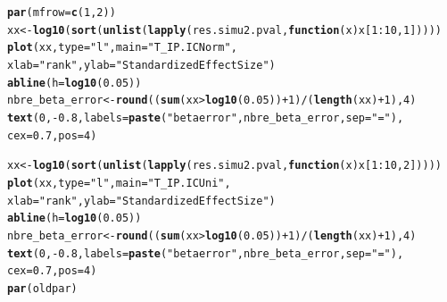 \documentclass[12pt]{article}\usepackage[]{graphicx}\usepackage[]{color}
\makeatletter
\newcommand{\hlnum}[1]{\textcolor[rgb]{0.686,0.059,0.569}{#1}}%
\newcommand{\hlstr}[1]{\textcolor[rgb]{0.192,0.494,0.8}{#1}}%
\newcommand{\hlopt}[1]{\textcolor[rgb]{0,0,0}{#1}}%
\newcommand{\hlstd}[1]{\textcolor[rgb]{0.345,0.345,0.345}{#1}}%
\newcommand{\hlkwa}[1]{\textcolor[rgb]{0.161,0.373,0.58}{\textbf{#1}}}%
\newcommand{\hlkwb}[1]{\textcolor[rgb]{0.69,0.353,0.396}{#1}}%
\newcommand{\hlkwc}[1]{\textcolor[rgb]{0.333,0.667,0.333}{#1}}%
\newcommand{\hlkwd}[1]{\textcolor[rgb]{0.737,0.353,0.396}{\textbf{#1}}}%
\newenvironment{kframe}{%
 \def\at@end@of@kframe{}%
 \ifinner\ifhmode%
  \def\at@end@of@kframe{\end{minipage}}%
  \begin{minipage}{\columnwidth}%
 \fi\fi%
 \def\FrameCommand##1{\hskip\@totalleftmargin \hskip-\fboxsep
 \colorbox{shadecolor}{##1}\hskip-\fboxsep
     \hskip-\linewidth \hskip-\@totalleftmargin \hskip\columnwidth}%
 \MakeFramed {\advance\hsize-\width
   \@totalleftmargin\z@ \linewidth\hsize
   \@setminipage}}%
 {\par\unskip\endMakeFramed%
 \at@end@of@kframe}
\newenvironment{knitrout}{}{} %
\makeatother
\begin{document}
\begin{knitrout}\small
{}\color{fgcolor}\begin{kframe}
\begin{alltt}
\hlkwd{par}\hlstd{(}\hlkwc{mfrow} \hlstd{=} \hlkwd{c}\hlstd{(}\hlnum{1}\hlstd{,} \hlnum{2}\hlstd{))}
\hlstd{xx} \hlkwb{<-} \hlkwd{log10}\hlstd{(}\hlkwd{sort}\hlstd{(}\hlkwd{unlist}\hlstd{(}\hlkwd{lapply}\hlstd{(res.simu2.pval,} \hlkwa{function}\hlstd{(}\hlkwc{x}\hlstd{) x[}\hlnum{1}\hlopt{:}\hlnum{10}\hlstd{,} \hlnum{1}\hlstd{]))))}
\hlkwd{plot}\hlstd{(xx,} \hlkwc{type} \hlstd{=} \hlstr{"l"}\hlstd{,} \hlkwc{main} \hlstd{=} \hlstr{"T_IP.IC Norm"}\hlstd{,}
     \hlkwc{xlab} \hlstd{=} \hlstr{"rank"}\hlstd{,} \hlkwc{ylab} \hlstd{=} \hlstr{"Standardized Effect Size"}\hlstd{)}
\hlkwd{abline}\hlstd{(}\hlkwc{h} \hlstd{=} \hlkwd{log10}\hlstd{(}\hlnum{0.05}\hlstd{))}
\hlstd{nbre_beta_error} \hlkwb{<-} \hlkwd{round}\hlstd{((}\hlkwd{sum}\hlstd{(xx}\hlopt{>}\hlkwd{log10}\hlstd{(}\hlnum{0.05}\hlstd{))}\hlopt{+}\hlnum{1}\hlstd{)}\hlopt{/}\hlstd{(}\hlkwd{length}\hlstd{(xx)}\hlopt{+}\hlnum{1}\hlstd{),} \hlnum{4}\hlstd{)}
\hlkwd{text}\hlstd{(}\hlnum{0}\hlstd{,} \hlopt{-}\hlnum{0.8}\hlstd{,} \hlkwc{labels} \hlstd{=} \hlkwd{paste}\hlstd{(}\hlstr{"beta error"}\hlstd{, nbre_beta_error,} \hlkwc{sep} \hlstd{=} \hlstr{" = "}\hlstd{),}
  \hlkwc{cex} \hlstd{=} \hlnum{0.7}\hlstd{,} \hlkwc{pos} \hlstd{=} \hlnum{4}\hlstd{)}

\hlstd{xx} \hlkwb{<-} \hlkwd{log10}\hlstd{(}\hlkwd{sort}\hlstd{(}\hlkwd{unlist}\hlstd{(}\hlkwd{lapply}\hlstd{(res.simu2.pval,} \hlkwa{function}\hlstd{(}\hlkwc{x}\hlstd{) x[}\hlnum{1}\hlopt{:}\hlnum{10}\hlstd{,} \hlnum{2}\hlstd{]))))}
\hlkwd{plot}\hlstd{(xx,} \hlkwc{type} \hlstd{=} \hlstr{"l"}\hlstd{,} \hlkwc{main} \hlstd{=} \hlstr{"T_IP.IC Uni"}\hlstd{,}
     \hlkwc{xlab} \hlstd{=} \hlstr{"rank"}\hlstd{,} \hlkwc{ylab} \hlstd{=} \hlstr{"Standardized Effect Size"}\hlstd{)}
\hlkwd{abline}\hlstd{(}\hlkwc{h} \hlstd{=} \hlkwd{log10}\hlstd{(}\hlnum{0.05}\hlstd{))}
\hlstd{nbre_beta_error} \hlkwb{<-} \hlkwd{round}\hlstd{((}\hlkwd{sum}\hlstd{(xx}\hlopt{>}\hlkwd{log10}\hlstd{(}\hlnum{0.05}\hlstd{))}\hlopt{+}\hlnum{1}\hlstd{)}\hlopt{/}\hlstd{(}\hlkwd{length}\hlstd{(xx)}\hlopt{+}\hlnum{1}\hlstd{),} \hlnum{4}\hlstd{)}
\hlkwd{text}\hlstd{(}\hlnum{0}\hlstd{,} \hlopt{-}\hlnum{0.8}\hlstd{,} \hlkwc{labels} \hlstd{=} \hlkwd{paste}\hlstd{(}\hlstr{"beta error"}\hlstd{, nbre_beta_error,} \hlkwc{sep} \hlstd{=} \hlstr{" = "}\hlstd{),}
  \hlkwc{cex} \hlstd{=} \hlnum{0.7}\hlstd{,} \hlkwc{pos} \hlstd{=} \hlnum{4}\hlstd{)}
\hlkwd{par}\hlstd{(oldpar)}
\end{alltt}
\end{kframe}\begin{figure}


\end{figure}
\end{knitrout}
\end{document}
